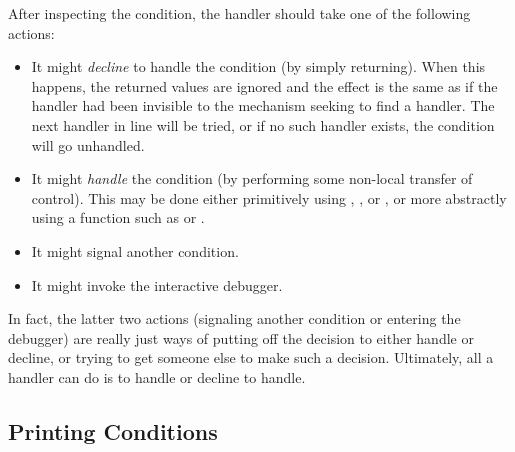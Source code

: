 After inspecting the condition, the handler should take one of the following
actions:
\begin{itemize}
  \item
    It might \emph{decline} to handle the condition (by simply returning). When
    this happens, the returned values are ignored and the effect is the same
    as if the handler had been invisible to the mechanism seeking to find a
    handler. The next handler in line will be tried, or if no such handler
    exists, the condition will go unhandled.

  \item
    It might \emph{handle} the condition (by performing some non-local transfer
    of control). This may be done either primitively using , , or ,
    or more abstractly using a function such as  or .

  \item
    It might signal another condition.

  \item
    It might invoke the interactive debugger.
\end{itemize}
In fact, the latter two actions (signaling another condition or entering the
debugger) are really just ways of putting off the decision to either handle
or decline, or trying to get someone else to make such a decision. Ultimately,
all a handler can do is to handle or decline to handle.

\subsection{Printing Conditions}

